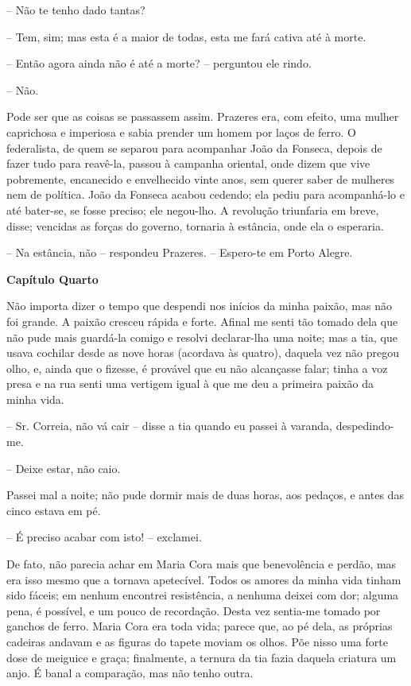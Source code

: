 -- Não te tenho dado tantas?

-- Tem, sim; mas esta é a maior de todas, esta me fará cativa até à
morte.

-- Então agora ainda não é até a morte? -- perguntou ele rindo.

-- Não.

Pode ser que as coisas se passassem assim. Prazeres era, com efeito, uma
mulher caprichosa e imperiosa e sabia prender um homem por laços de
ferro. O federalista, de quem se separou para acompanhar João da
Fonseca, depois de fazer tudo para reavê-la, passou à campanha oriental,
onde dizem que vive pobremente, encanecido e envelhecido vinte anos, sem
querer saber de mulheres nem de política. João da Fonseca acabou
cedendo; ela pediu para acompanhá-lo e até bater-se, se fosse preciso;
ele negou-lho. A revolução triunfaria em breve, disse; vencidas as
forças do governo, tornaria à estância, onde ela o esperaria.

-- Na estância, não -- respondeu Prazeres. -- Espero-te em Porto Alegre.

\textbf{Capítulo Quarto}

Não importa dizer o tempo que despendi nos inícios da minha paixão, mas
não foi grande. A paixão cresceu rápida e forte. Afinal me senti tão
tomado dela que não pude mais guardá-la comigo e resolvi declarar-lha
uma noite; mas a tia, que usava cochilar desde as nove horas (acordava
às quatro), daquela vez não pregou olho, e, ainda que o fizesse, é
provável que eu não alcançasse falar; tinha a voz presa e na rua senti
uma vertigem igual à que me deu a primeira paixão da minha vida.

-- Sr. Correia, não vá cair -- disse a tia quando eu passei à varanda,
despedindo-me.

-- Deixe estar, não caio.

Passei mal a noite; não pude dormir mais de duas horas, aos pedaços, e
antes das cinco estava em pé.

-- É preciso acabar com isto! -- exclamei.

De fato, não parecia achar em Maria Cora mais que benevolência e perdão,
mas era isso mesmo que a tornava apetecível. Todos os amores da minha
vida tinham sido fáceis; em nenhum encontrei resistência, a nenhuma
deixei com dor; alguma pena, é possível, e um pouco de recordação. Desta
vez sentia-me tomado por ganchos de ferro. Maria Cora era toda vida;
parece que, ao pé dela, as próprias cadeiras andavam e as figuras do
tapete moviam os olhos. Põe nisso uma forte dose de meiguice e graça;
finalmente, a ternura da tia fazia daquela criatura um anjo. É banal a
comparação, mas não tenho outra.


